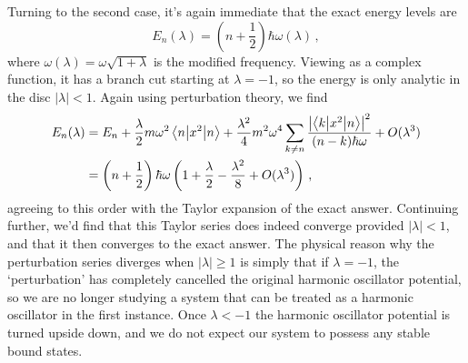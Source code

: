 \documentclass{article}
\theoremstyle{plain}\theoremheaderfont{\normalfont\itshape}\theorembodyfont{\rmfamily}\theoremseparator{.}\newtheorem*{rem}{Remark}\newtheorem*{ex}{Example}\newtheorem*{proof}{Proof}\newtheorem*{altp}{Alternative proof}
\theoremstyle{plain}\theoremheaderfont{\normalfont\bfseries}\theorembodyfont{\rmfamily}\theoremseparator{.}\newtheorem{thm}{Theorem}[section]\newtheorem{lem}[thm]{Lemma}\newtheorem{prop}[thm]{Proposition}\newtheorem*{cor}{Corollary}\newtheorem{defn}[thm]{Definition}\newtheorem{clm}[thm]{Claim}\newtheorem{clminproof}{Claim}
\theoremstyle{break}\theoremheaderfont{\normalfont\itshape}\theorembodyfont{\rmfamily}\theoremseparator{.\medskip}\newtheorem*{proofskip}{Proof}\newtheorem*{exs}{Examples}\newtheorem*{rems}{Remarks}
\theoremstyle{break}\theoremheaderfont{\normalfont\bfseries}\theorembodyfont{\rmfamily}\theoremseparator{.\medskip}\newtheorem{lemskip}[thm]{Lemma}\newtheorem{defnskip}[thm]{Definition}\newtheorem{propskip}[thm]{Proposition}\newtheorem{thmskip}[thm]{Theorem}
\numberwithin{equation}{section}
\newcommand{\mel}[3]{\left\langle #1 \middle| #2 \middle| #3 \right\rangle}
\newcommand{\expval}[2]{\left\langle #2 \middle| #1 \middle| #2 \right\rangle}
\newcommand{\abs}[1]{\left| #1 \right|}
\begin{document}
    Turning to the second case, it's again immediate that the exact energy levels are
    \begin{equation}
        E_n(\lambda)=\left(n+\frac{1}{2}\right)\hbar\omega(\lambda)\,,
    \end{equation}
    where \(\omega(\lambda)=\omega\sqrt{1+\lambda}\) is the modified frequency. Viewing as a complex function, it has a branch cut starting at \(\lambda=-1\), so the energy is only analytic in the disc \(\abs{\lambda}<1\). Again using perturbation theory, we find
    \begin{align}
        E_n(\lambda)&=E_n+\frac{\lambda}{2}m\omega^2\expval{x^2}{n}+\frac{\lambda^2}{4}m^2\omega^4\sum_{k\ne n}\frac{\abs{\mel{k}{x^2}{n}}^2}{(n-k)\hbar\omega}+O(\lambda^3)\notag\\
        &=\left(n+\frac{1}{2}\right)\hbar\omega\left(1+\frac{\lambda}{2}-\frac{\lambda^2}{8}+O(\lambda^3)\right)\,,
    \end{align}
    agreeing to this order with the Taylor expansion of the exact answer. Continuing further, we'd find that this Taylor series does indeed converge provided \(\abs{\lambda}<1\), and that it then converges to the exact answer. The physical reason why the perturbation series diverges when \(\abs{\lambda}\ge 1\) is simply that if \(\lambda=-1\), the `perturbation' has completely cancelled the original harmonic oscillator potential, so we are no longer studying a system that can be treated as a harmonic oscillator in the first instance. Once \(\lambda<-1\) the harmonic oscillator potential is turned upside down, and we do not expect our system to possess any stable bound states.
\end{document}
